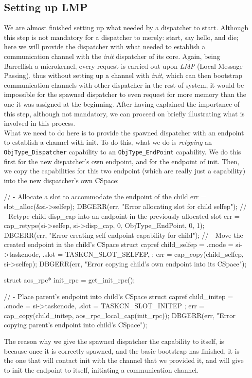 \documentclass[a4paper,twoside,openright]{report}
\begin{document}
\subsection{Setting up LMP}
We are almost finished setting up what needed by a dispatcher to start. Although this step is not mandatory for a dispatcher to merely: start, say hello, and die; 
here we will provide the dispatcher with what needed to establish a communication channel with the \emph{init} dispatcher of its core.
Again, being Barrelfish a microkernel, every request is carried out upon \emph{LMP} (Local Message Passing), thus without setting up a channel with \emph{init}, which can then bootstrap communication channels with other dispatcher in the rest of system, it would be impossible for the spawned dispatcher to even request for more memory than the one it was assigned at the beginning.
After having explained the importance of this step, although not mandatory, we can proceed on briefly illustrating what is involved in this process.\\

What we need to do here is to provide the spawned dispatcher with an endpoint to establish a channel with init.
To do this, what we do is \emph{retyping} an \texttt{ObjType\_Dispatcher} capability to an \texttt{ObjType\_EndPoint} capability.
We do this first for the new dispatcher's own endpoint, and for the endpoint of init.
Then, we copy the capabilities for this two endpoint (which are really just a capability) into the new dispatcher's own CSpace:
\begin{pandacode}
    // - Allocate a slot to accommodate the endpoint of the child
    err = slot_alloc(&si->selfep);
    DBGERR(err, "Error allocating slot for child selfep\n");
    // - Retype child disp_cap into an endpoint in the previously allocated slot
    err = cap_retype(si->selfep, si->disp_cap, 0, ObjType_EndPoint, 0, 1);
    DBGERR(err, "Error creating self endpoint capability for child\n");
    // - Move the created endpoint in the child's CSpace
    struct capref child_selfep = {
        .cnode = si->taskcnode,
        .slot = TASKCN_SLOT_SELFEP,
    };
    err = cap_copy(child_selfep, si->selfep);
    DBGERR(err, "Error copying child's own endpoint into its CSpace\n");

    struct aos_rpc* init_rpc = get_init_rpc();

    // - Place parent's endpoint into child's CSpace
    struct capref child_initep = {
        .cnode = si->taskcnode,
        .slot = TASKCN_SLOT_INITEP
    };
    err = cap_copy(child_initep, aos_rpc_local_cap(init_rpc));
    DBGERR(err, "Error copying parent's endpoint into child's CSpace");
\end{pandacode} 
The reason why we give the spawned dispatcher the capability to itself, is because once it is correctly spawned, and the basic bootstrap has finished, it is the one that will contact init with the channel that we provided it, and will give to init the endpoint to itself, initiating a communication channel.
\end{document}
